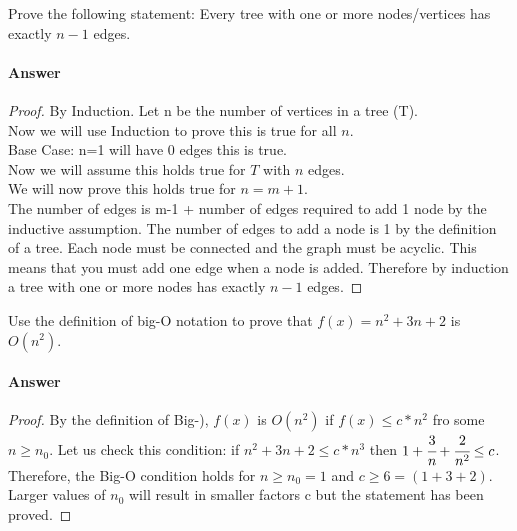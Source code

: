 \documentclass{article}
\begin{document}



\nextprob
Prove the following statement: Every tree with one or more nodes/vertices has
exactly $n-1$ edges.

\paragraph{Answer}


\begin{proof}
	By Induction. Let n be the number of vertices in a tree (T). \\
	Now we will use Induction to prove this is true for all $n$.\\
	Base Case: n=1 will have 0 edges this is true. \\
	Now we will assume this holds true for $T$ with $n$ edges. \\ 
	We will now prove this holds true for $n=m+1$. \\
	The number of edges is m-1 + number of edges required to add 1 node by the inductive assumption. 
	The number of edges to add a node is 1 by the definition of a tree. Each node must be connected and the graph must be acyclic. This means that you must add one edge when a node is added.
	Therefore by induction a tree with one or more nodes has exactly $n-1$ edges. 
	
\end{proof}




\nextprob
Use the definition of big-O notation to prove that $f(x)=n^2 + 3n +2$ is
$O(n^2)$.

\paragraph{Answer}


\begin{proof}
	By the definition of Big-), $f(x)$ is $O(n^2)$ if $f(x) \leq c*n^2$ fro some $n \geq n_0$. Let us check this condition: if $n^2 + 3n + 2 \leq c*n^3$ then $1 + \cfrac{3}{n} + \cfrac{2}{n^2} \leq c$. Therefore, the Big-O condition holds for $n\geq n_0 = 1$ and $c \geq 6 = (1 + 3 + 2)$. Larger values of $n_0$ will result in smaller factors c but the statement has been proved. 
	
\end{proof}
\end{document}
